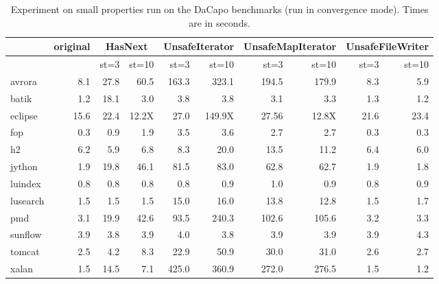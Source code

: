 \documentclass{article} %
\theoremstyle{definition}
\theoremstyle{remark}
\begin{document}
\begin{table}[t]
\begin{center}
\begin{tabular}{|l|r||r|r||r|r||r|r||r|r|} \hline
  & original  & \multicolumn{2}{|c||}{HasNext} & \multicolumn{2}{c||}{UnsafeIterator} &\multicolumn{2}{|c||}{UnsafeMapIterator} & \multicolumn{2}{|c|}{UnsafeFileWriter}
  \\ \hline
  & & st=3 & st=10 & st=3 & st=10 & st=3 & st=10 & st=3 & st=10 
  \\ \hline \hline
 avrora  & 8.1 & 27.8 & 60.5 & 163.3 & 323.1 & 194.5  & 179.9 & 8.3 & 5.9 
 \\ \hline
 batik     &  1.2  & 18.1 &    3.0 & 3.8 &  3.8  & 3.1 &  3.3 & 1.3  &  1.2 
 \\ \hline
eclipse   &  15.6  &  22.4 &  12.2X & 27.0 &  149.9X & 27.56 &  12.8X & 21.6 &  23.4 
\\ \hline
fop    &   0.3   &  0.9 &  1.9 & 3.5  &  3.6   & 2.7 &   2.7 & 0.3 &   0.3
\\ \hline
h2     &    6.2  &  5.9 &  6.8   & 8.3    & 20.0  & 13.5 & 11.2   & 6.4 & 6.0  
\\ \hline
jython    &  1.9  & 19.8 &  46.1 &  81.5   & 83.0  &  62.8 &       62.7    & 1.9 & 1.8 
\\ \hline
luindex     &  0.8   & 0.8 &   0.8    & 0.8 & 0.9  & 1.0  &   0.9 & 0.8 & 0.9 
\\ \hline
lusearch    &  1.5  &  1.5 &   1.5 & 15.0 &  16.0    & 13.8  &  12.8    & 1.5 & 1.7 
\\ \hline
pmd        &   3.1    & 19.9 & 42.6  &  93.5 & 240.3   & 102.6 &       105.6  & 3.2 &           3.3 
\\ \hline
sunflow    &  3.9   & 3.8 &  3.9  &  4.0 & 3.8    & 3.9 &        3.9     & 3.9 &         4.3 
\\ \hline
tomcat     &   2.5    & 4.2 & 8.3   & 22.9 & 50.9   & 30.0 &        31.0   & 2.6 &          2.7 
\\ \hline
xalan      &    1.5   &  14.5      & 7.1 & 425.0  & 360.9 &  272.0   & 276.5 &  1.5 & 1.2 
\\ \hline  
\end{tabular}
\end{center}
\caption{Experiment on small properties run on the DaCapo benchmarks
  (run in convergence mode). Times are in seconds.}
\label{table:experiments}%
\end{table}
\end{document}
